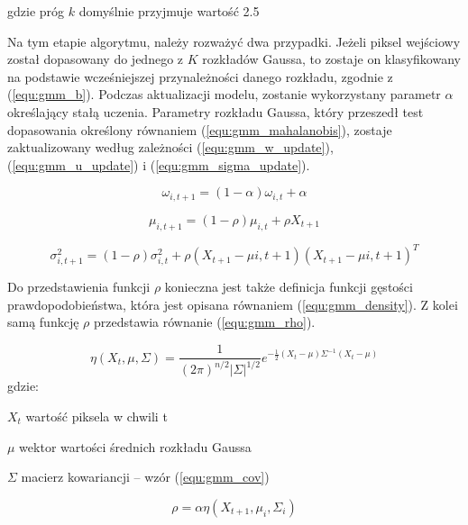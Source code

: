 \noindent gdzie próg $k$ domyślnie przyjmuje wartość \num{2.5}


Na tym etapie algorytmu, należy rozważyć dwa przypadki. 
Jeżeli piksel wejściowy został dopasowany do jednego z $K$ rozkładów Gaussa, to zostaje on klasyfikowany na podstawie wcześniejszej przynależności danego rozkładu, zgodnie z (\ref{equ:gmm_b}). 
Podczas aktualizacji modelu, zostanie wykorzystany parametr $\alpha$ określający stałą uczenia. 
Parametry rozkładu Gaussa, który przeszedł test dopasowania określony równaniem (\ref{equ:gmm_mahalanobis}), zostaje zaktualizowany według zależności (\ref{equ:gmm_w_update}), (\ref{equ:gmm_u_update}) i (\ref{equ:gmm_sigma_update}).

    \begin{equation}
        \omega_{i, t+1} = (1-\alpha)\omega_{i,t} + \alpha
    \label{equ:gmm_w_update}
    \end{equation}

    \begin{equation}
        \mu_{i, t+1} = (1-\rho)\mu_{i,t} + \rho X_{t+1}
    \label{equ:gmm_u_update}
    \end{equation}

    \begin{equation}
        \sigma_{i, t+1}^2 = (1-\rho)\sigma_{i,t}^2 + \rho (X_{t+1} - \mu{i,t+1})(X_{t+1} - \mu{i,t+1})^T
    \label{equ:gmm_sigma_update}
    \end{equation}

\noindent Do przedstawienia funkcji $\rho$ konieczna jest także definicja funkcji gęstości prawdopodobieństwa, która jest opisana równaniem (\ref{equ:gmm_density}). 
Z kolei samą funkcję $\rho$ przedstawia równanie (\ref{equ:gmm_rho}).

    \begin{equation}
        \eta (X_t, \mu, \Sigma) = \frac{1}{(2\pi)^{n/2} |\Sigma|^{1/2}} e^{-\frac{1}{2} (X_t - \mu)\Sigma^{-1} (X_t - \mu)} 
    \label{equ:gmm_density}
    \end{equation}
gdzie:
\begin{eqwhere}[2cm]
	\item[$X_t$] wartość piksela w chwili t
	\item[$\mu$] wektor wartości średnich rozkładu Gaussa
	\item[$\Sigma$] macierz kowariancji -- wzór (\ref{equ:gmm_cov})\\
\end{eqwhere}


    \begin{equation}
        \rho = \alpha \eta(X_{t+1}, \mu_{i}, \Sigma_{i})
    \label{equ:gmm_rho}
    \end{equation}


